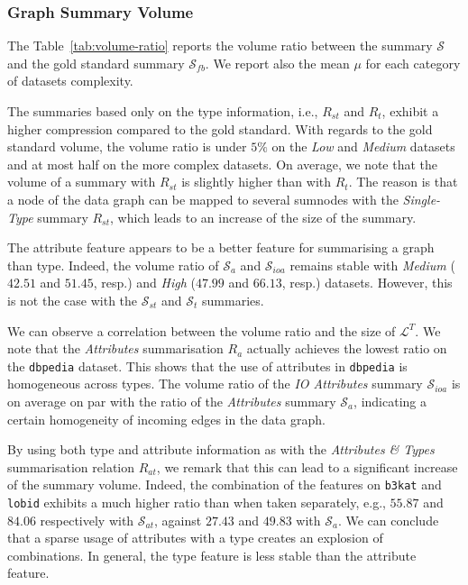 \subsubsection{Graph Summary Volume}

The Table~\ref{tab:volume-ratio} reports the volume ratio between the summary $\mathcal{S}$ and the gold standard summary $\mathcal{S}_{fb}$. We report also the mean $\mu$ for each category of datasets complexity.

The summaries based only on the type information, i.e., $R_{st}$ and $R_t$, exhibit a higher compression compared to the gold standard. With regards to the gold standard volume, the volume ratio is under $5\%$ on the \emph{Low} and \emph{Medium} datasets and at most half on the more complex datasets. On average, we note that the volume of a summary with $R_{st}$ is slightly higher than with $R_t$. The reason is that a node of the data graph can be mapped to several sumnodes with the \emph{Single-Type} summary $R_{st}$, which leads to an increase of the size of the summary.

The attribute feature appears to be a better feature for summarising a graph than type. Indeed, the volume ratio of $\mathcal{S}_a$ and $\mathcal{S}_{ioa}$ remains stable with \emph{Medium} ($42.51$ and $51.45$, resp.) and \emph{High} ($47.99$ and $66.13$, resp.) datasets. However, this is not the case with the $\mathcal{S}_{st}$ and $\mathcal{S}_t$ summaries. 

We can observe a correlation between the volume ratio and the size of $\mathcal{L}^T$.
We note that the \emph{Attributes} summarisation $R_a$ actually achieves the lowest ratio on the \texttt{dbpedia} dataset. This shows that the use of attributes in \texttt{dbpedia} is homogeneous across types. The volume ratio of the \emph{IO Attributes} summary $\mathcal{S}_{ioa}$ is on average on par with the ratio of the \emph{Attributes} summary $\mathcal{S}_a$, indicating a certain homogeneity of incoming edges in the data graph.

By using both type and attribute information as with the \emph{Attributes \& Types} summarisation relation $R_{at}$, we remark that this can lead to a significant increase of the summary volume. Indeed, the combination of the features on \texttt{b3kat} and \texttt{lobid} exhibits a much higher ratio than when taken separately, e.g., $55.87$ and $84.06$ respectively with $\mathcal{S}_{at}$, against $27.43$ and $49.83$ with $\mathcal{S}_a$. We can conclude that a sparse usage of attributes with a type creates an explosion of combinations. In general, the type feature is less stable than the attribute feature.

